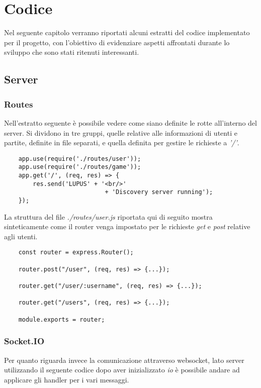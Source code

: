 \chapter{Codice}
Nel seguente capitolo verranno riportati alcuni estratti del codice implementato per il progetto, con l'obiettivo di evidenziare aspetti affrontati durante lo sviluppo che sono stati ritenuti interessanti.

\section{Server}

\subsection{Routes}

Nell'estratto seguente è possibile vedere come siano definite le rotte all'interno del server. Si dividono in tre gruppi, quelle relative alle informazioni di utenti e partite, definite in file separati, e quella definita per gestire le richieste a \emph{'/'}.

\begin{verbatim}
    app.use(require('./routes/user'));
    app.use(require('./routes/game'));
    app.get('/', (req, res) => {
        res.send('LUPUS' + '<br/>'
                            + 'Discovery server running');
    });
\end{verbatim}

La struttura del file \emph{./routes/user.js} riportata qui di seguito mostra sinteticamente come il router venga impostato per le richieste \emph{get} e \emph{post} relative agli utenti.

\begin{verbatim}
    const router = express.Router();
    
    router.post("/user", (req, res) => {...});
    
    router.get("/user/:username", (req, res) => {...});
    
    router.get("/users", (req, res) => {...});
    
    module.exports = router;
\end{verbatim}

\subsection{Socket.IO}

Per quanto riguarda invece la comunicazione attraverso websocket, lato server utilizzando il seguente codice dopo aver inizializzato \emph{io} è possibile andare ad applicare gli handler per i vari messaggi.

